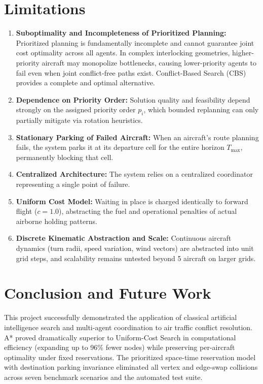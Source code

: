 \documentclass[11pt,a4paper]{article}
\begin{document}
\section{Limitations}
\begin{enumerate}
    \item \textbf{Suboptimality and Incompleteness of Prioritized Planning:} Prioritized planning is fundamentally incomplete and cannot guarantee joint cost optimality across all agents. In complex interlocking geometries, higher-priority aircraft may monopolize bottlenecks, causing lower-priority agents to fail even when joint conflict-free paths exist. Conflict-Based Search (CBS) \cite{sharon2015} provides a complete and optimal alternative.
    \item \textbf{Dependence on Priority Order:} Solution quality and feasibility depend strongly on the assigned priority order $p_i$, which bounded replanning can only partially mitigate via rotation heuristics.
    \item \textbf{Stationary Parking of Failed Aircraft:} When an aircraft's route planning fails, the system parks it at its departure cell for the entire horizon $T_{\max}$, permanently blocking that cell.
    \item \textbf{Centralized Architecture:} The system relies on a centralized coordinator representing a single point of failure.
    \item \textbf{Uniform Cost Model:} Waiting in place is charged identically to forward flight ($c=1.0$), abstracting the fuel and operational penalties of actual airborne holding patterns.
    \item \textbf{Discrete Kinematic Abstraction and Scale:} Continuous aircraft dynamics (turn radii, speed variation, wind vectors) are abstracted into unit grid steps, and scalability remains untested beyond 5 aircraft on larger grids.
\end{enumerate}

\section{Conclusion and Future Work}
This project successfully demonstrated the application of classical artificial intelligence search and multi-agent coordination to air traffic conflict resolution. A* proved dramatically superior to Uniform-Cost Search in computational efficiency (expanding up to 96\% fewer nodes) while preserving per-aircraft optimality under fixed reservations. The prioritized space-time reservation model with destination parking invariance eliminated all vertex and edge-swap collisions across seven benchmark scenarios and the automated test suite.
\end{document}
